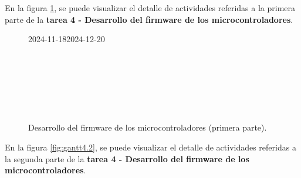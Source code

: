 En la figura \ref{fig:gantt4.1}, se puede visualizar el detalle de actividades
referidas a la primera parte de la \textbf{tarea 4 - Desarrollo del firmware de
	los microcontroladores}.

\begin{figure}[H]
	\begin{ganttchart}[
			time slot unit=day,
			time slot format=isodate,
			x unit=0.33cm, %
			y unit title=0.7cm, %
			y unit chart=0.7cm, %
			milestone/.append style={xscale=4},
			vgrid,
			hgrid,
		]{2024-11-18}{2024-12-20}
		 \\
		 \\
		 \\
		 \\
		 \\
		 \\
		 \\
	\end{ganttchart}
	\caption{Desarrollo del firmware de los microcontroladores (primera parte).}
	\label{fig:gantt4.1}
\end{figure}

En la figura \ref{fig:gantt4.2}, se puede visualizar el detalle de actividades
referidas a la segunda parte de la \textbf{tarea 4 - Desarrollo del firmware de
	los microcontroladores}.

